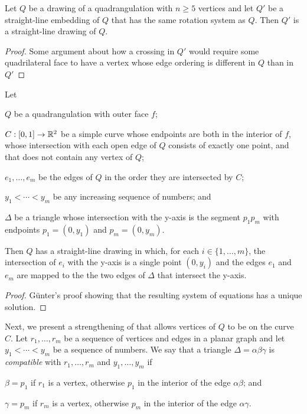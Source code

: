 \documentclass{patmorin}
\begin{document}
\begin{lem}
   Let $Q$ be a drawing of a quadrangulation with $n\ge 5$ vertices
   and let $Q'$ be a straight-line embedding of $Q$ that has the same
   rotation system as $Q$.  Then $Q'$ is a straight-line drawing of $Q$.
\end{lem}

\begin{proof}
   Some argument about how a crossing in $Q'$ would require some
   quadrilateral face to have a vertex whose edge ordering is different
   in $Q$ than in $Q'$
\end{proof}



\begin{lem}
    Let
    \begin{compactitem}
    \item $Q$ be a quadrangulation with outer face $f$; 
    \item $C:[0,1]\to\mathbb{R}^2$ be a simple curve
     whose endpoints are both in the interior of $f$, 
     whose intersection with each open edge of $Q$
     consists of exactly one point, and that does not contain
     any vertex of $Q$; 
    \item $e_1,\ldots,e_m$ be the edges of $Q$ in the
    order they are intersected by $C$; 
    \item $y_1<\cdots<y_m$
    be any increasing sequence of numbers; and
    \item $\Delta$ be a triangle whose intersection with the y-axis
     is the segment $p_1p_m$ with endpoints $p_1=(0,y_1)$ and $p_m=(0,y_m)$.
    \end{compactitem}
    Then $Q$ has a straight-line
    drawing in which, for each $i\in\{1,\ldots,m\}$, the intersection
    of $e_i$ with the y-axis is a single point $(0,y_i)$ and the edges
    $e_1$ and $e_m$ are mapped to the the two edges of $\Delta$ that
    intersect the y-axis.
\end{lem}

\begin{proof}
   G\"unter's proof showing that the resulting system of equations has
   a unique solution.
\end{proof}

Next, we present a strengthening of  that allows vertices
of $Q$ to be on the curve $C$.  Let $r_1,\ldots,r_m$ be a sequence
of vertices and edges in a planar graph and let $y_1<\cdots<y_m$ be a
sequence of numbers.  We say that a triangle $\Delta=\alpha\beta\gamma$
is \emph{compatible} with $r_1,\ldots,r_m$ and $y_1,\ldots,y_m$ if
\begin{compactenum}
  \item $\beta=p_1$ if $r_1$ is a vertex, otherwise $p_1$ in the interior
  of the edge $\alpha\beta$; and
  \item $\gamma=p_m$ if $r_m$ is a vertex, otherwise $p_m$ in the interior
  of the edge $\alpha\gamma$.
\end{compactenum}
\end{document}
